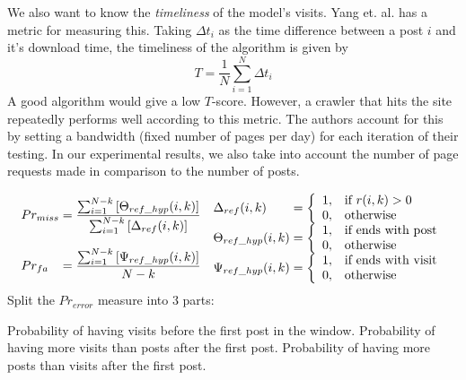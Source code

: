 We also want to know the \emph{timeliness} of the model's visits. Yang et. al.  
\cite{Yang2009} has a metric for measuring this. Taking $\Delta t_i$ as the time 
difference between a post $i$ and it's download time, the timeliness of the 
algorithm is given by
\[T = \frac{1}{N} \sum^{N}_{i=1}\Delta t_i\]
A good algorithm would give a low $T$-score. However, a crawler that hits the 
site repeatedly performs well according to this metric. The authors account for 
this by setting a bandwidth (fixed number of pages per day) for each iteration 
of their testing. In our experimental results, we also take into account the 
number of page requests made in comparison to the number of posts. %

\begin{align*}
	\begin{array}{l@{\mskip\thickmuskip}l}
	Pr_{miss} &=  \dfrac{%
		\sum^{N-k}_{i=1} \left[\Theta_{ref\_hyp} (i,k)\right]%
	}{%
		\sum^{N-k}_{i=1} \left[\Delta_{ref} (i,k)\right]%
	}\\
	 & \\
	Pr_{fa} &= \dfrac{%
		\sum^{N-k}_{i=1} \left[\Psi_{ref\_hyp} (i,k)\right]%
	}{N-k}
	\end{array}
	\begin{array}{l@{\mskip\thickmuskip}l}
		\Delta_{ref}(i,k) &= \left\{ \begin{array}{l l}
				1, & \text{if }r(i,k) > 0 \\
				0, & \text{otherwise} 
		\end{array} \right.\\
		\Theta_{ref\_hyp}(i,k) &= \left\{ \begin{array}{l l}
				1, & \text{if ends with post} \\
				0, & \text{otherwise} 
		\end{array} \right.\\
		\Psi_{ref\_hyp}(i,k) &= \left\{ \begin{array}{l l}
				1, & \text{if ends with visit}\\
				0, & \text{otherwise} 
		\end{array} \right.\\
	\end{array}
\end{align*}
Split the $Pr_{error}$ measure into 3 parts:

Probability of having visits before the first post in the window.
Probability of having more visits than posts after the first post.
Probability of having more posts than visits after the first post.



